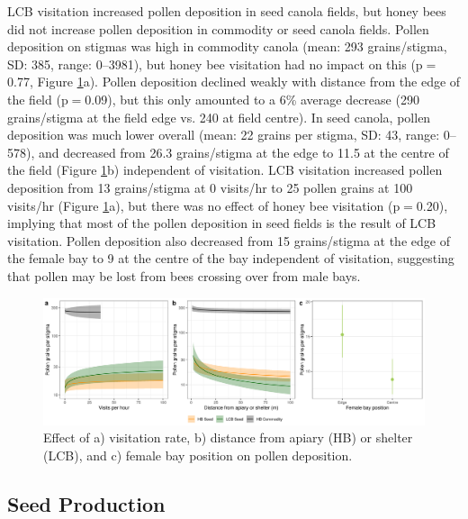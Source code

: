 \documentclass[12pt]{article} %
\begin{document}
LCB visitation increased pollen deposition in seed canola fields, but honey bees did not increase pollen deposition in commodity or seed canola fields.
Pollen deposition on stigmas was high in commodity canola (mean: 293 grains/stigma, SD: 385, range: 0--3981), but honey bee visitation had no impact on this (p$=$0.77, Figure \ref{fig:allPollen}a).
Pollen deposition declined weakly with distance from the edge of the field (p$=$0.09), but this only amounted to a 6\% average decrease (290 grains/stigma at the field edge vs. 240 at field centre).
In seed canola, pollen deposition was much lower overall (mean: 22 grains per stigma, SD: 43, range: 0--578), and decreased from 26.3 grains/stigma at the edge to 11.5 at the centre of the field (Figure \ref{fig:allPollen}b) independent of visitation.
LCB visitation increased pollen deposition from 13 grains/stigma at 0 visits/hr to 25 pollen grains at 100 visits/hr (Figure \ref{fig:allPollen}a), but there was no effect of honey bee visitation (p$=$0.20), implying that most of the pollen deposition in seed fields is the result of LCB visitation.
Pollen deposition also decreased from 15 grains/stigma at the edge of the female bay to 9 at the centre of the bay independent of visitation, suggesting that pollen may be lost from bees crossing over from male bays.%

\begin{figure}
    \centering
    \includegraphics[width=\textwidth,keepaspectratio=true]{../Figures/allPollen.png}
    \caption{Effect of a) visitation rate, b) distance from apiary (HB) or shelter (LCB), and c) female bay position on pollen deposition.}
    \label{fig:allPollen}
\end{figure}


\subsection*{Seed Production}
\end{document}
